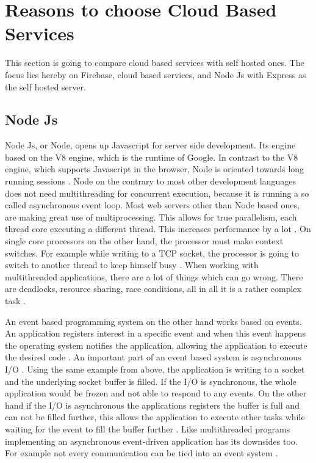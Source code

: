 \section{Reasons to choose Cloud Based Services}
This section is going to compare cloud based services with self hosted ones. The focus lies hereby on Firebase, cloud based services, and Node Js with Express as the self hosted server. 

\subsection{Node Js}
Node Js, or Node, opens up Javascript for server side development. Its engine based on the V8 engine, which is the runtime of Google. In contrast to the V8 engine, which supports Javascript in the browser, Node is oriented towards long running sessions \cite{tilkov2010node}. Node on the contrary to most other development languages does not need multithreading for concurrent execution, because it is running a so called asynchronous event loop. Most web servers other than Node based ones, are making great use of multiprocessing. This allows for true parallelism, each thread core executing a different thread. This increases performance by a lot \cite{tilkov2010node}. On single core processors on the other hand, the processor must make context switches. For example while writing to a TCP socket, the processor is going to switch to another thread to keep himself busy \cite{tilkov2010node}. When working with multithreaded applications, there are a lot of things which can go wrong. There are deadlocks, resource sharing, race conditions, all in all it is a rather complex task \cite{tilkov2010node}. 

An event based programming system on the other hand works based on events. An application registers interest in a specific event and when this event happens the operating system notifies the application, allowing the application to execute the desired code \cite{tilkov2010node}. An important part of an event based system is asynchronous I/O \cite{chaniotis2015node}. Using the same example from above, the application is writing to a socket and the underlying socket buffer is filled. If the I/O is synchronous, the whole application would be frozen and not able to respond to any events. On the other hand if the I/O is asynchronous the applications registers the buffer is full and can not be filled further, this allows the application to execute other tasks while waiting for the event to fill the buffer further \cite{tilkov2010node}. Like multithreaded programs implementing an asynchronous event-driven application has its downsides too. For example not every communication can be tied into an event system \cite{tilkov2010node}.  

